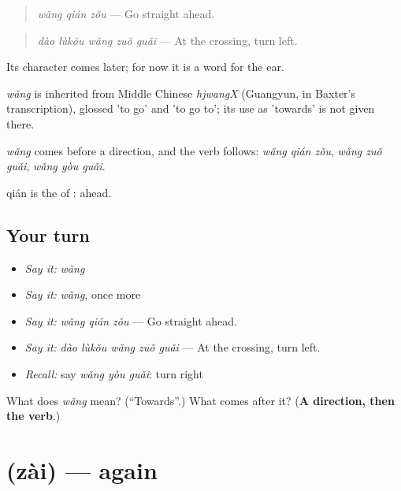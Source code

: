 \begin{quote}
\emph{wǎng qián zǒu} — Go straight ahead.
\end{quote}

\begin{quote}
\emph{dào lùkǒu wǎng zuǒ guǎi} — At the crossing, turn left.
\end{quote}

Its character comes later; for now it is a word for the ear.

\begin{cousinweb}
\emph{wǎng} is inherited from Middle Chinese \emph{hjwangX} (Guangyun, in Baxter's transcription), glossed 'to go' and 'to go to'; its use as 'towards' is not given there.
\end{cousinweb}

\begin{grammarlens}[title={What you've built}]
\emph{wǎng} comes before a direction, and the verb follows: \emph{wǎng qián zǒu}, \emph{wǎng zuǒ guǎi}, \emph{wǎng yòu guǎi}.

qián is the  of : ahead.
\end{grammarlens}

\subsection*{Your turn}
\begin{itemize}
\raggedright
  \item \emph{Say it:} \emph{wǎng}
  \item \emph{Say it:} \emph{wǎng}, once more
  \item \emph{Say it:} \emph{wǎng qián zǒu} — Go straight ahead.
  \item \emph{Say it:} \emph{dào lùkǒu wǎng zuǒ guǎi} — At the crossing, turn left.
  \item \emph{Recall:} say \emph{wǎng yòu guǎi}: turn right
\end{itemize}

\begin{tcolorbox}[breakable,colback=teal!4,colframe=teal!35!black,title={Before you move on}]
What does \emph{wǎng} mean? (\textquotedblleft{}Towards\textquotedblright{}.) What comes after it? (\textbf{A direction, then the verb}.)
\end{tcolorbox}
\section[\texorpdfstring{\zh{再} (zài)}{再 (zài)}]{ (zài) — again}

